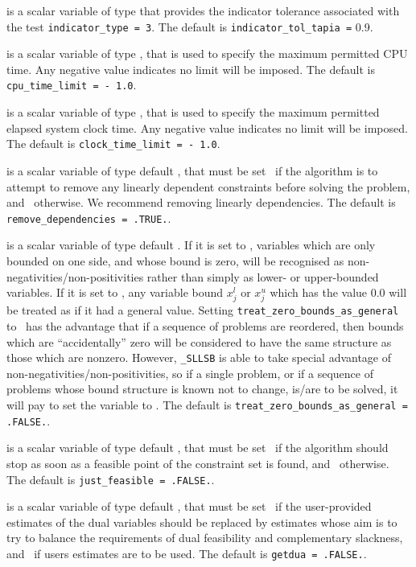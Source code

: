 \documentclass{galahad}
\newcommand{\packagename}{SLLSB}
\newcommand{\fullpackagename}{\libraryname\_\packagename}
\begin{document}
\begin{description}
is a scalar variable of type \realdp that
provides the indicator tolerance associated with the test
{\tt indicator\_type = 3}.
The default is {\tt indicator\_tol\-\_tapia =} 0.9.

 is a scalar variable of type \realdp,
that is used to specify the maximum permitted CPU time. Any negative
value indicates no limit will be imposed. The default is
{\tt cpu\_time\_limit = - 1.0}.

 is a scalar variable of type \realdp,
that is used to specify the maximum permitted elapsed system clock time.
Any negative value indicates no limit will be imposed. The default is
{\tt clock\_time\_limit = - 1.0}.

 is a scalar variable of type
default \logical, that must be set \true\ if the algorithm
is to attempt to remove any linearly dependent constraints before
solving the problem, and \false\ otherwise.
We recommend removing linearly dependencies.
The default is {\tt remove\_dependencies = .TRUE.}.

 is a scalar variable of type
default \logical.
If it is set to \false, variables which
are only bounded on one side, and whose bound is zero,
will be recognised as non-negativities/non-positivities rather than simply as
lower- or upper-bounded variables.
If it is set to \true, any variable bound
$x_{j}^{l}$ or $x_{j}^{u}$ which has the value 0.0 will be
treated as if it had a general value.
Setting {\tt treat\_zero\_bounds\_as\_general} to \true\ has the advantage
that if a sequence of problems are reordered, then bounds which are
``accidentally'' zero will be considered to have the same structure as
those which are nonzero. However, {\tt \fullpackagename} is
able to take special advantage of non-negativities/non-positivities, so
if a single problem, or if a sequence of problems whose
bound structure is known not to change, is/are to be solved,
it will pay to set the variable to \false.
The default is {\tt treat\_zero\_bounds\_as\_general = .FALSE.}.

 is a scalar variable of type default \logical, that
must be set \true\ if the algorithm should stop as soon as a feasible point
of the constraint set is found, and \false\ otherwise.
The default is {\tt just\_feasible = .FALSE.}.

 is a scalar variable of type default \logical, that
must be set \true\ if the user-provided estimates of the dual variables
should be replaced by estimates whose aim is to try to balance the
requirements of dual feasibility and complementary slackness,
and \false\ if users estimates are to be used.
The default is {\tt getdua = .FALSE.}.


\end{description}
\end{document}
